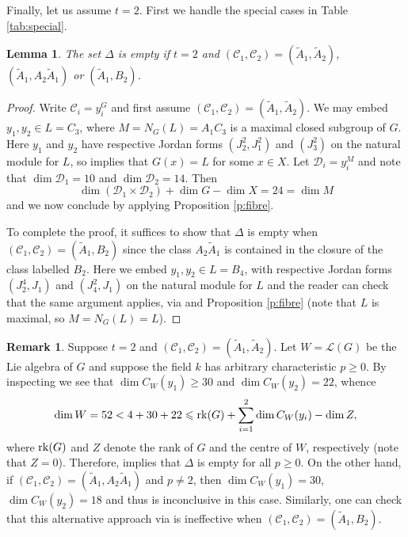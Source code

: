 \documentclass[twoside,a4paper,reqno,11pt]{amsart}
\newcommand{\<}{\langle}
\renewcommand{\>}{\rangle}
\newcommand{\leqs}{\leqslant}
\newcommand{\geqs}{\geqslant}
\renewcommand{\:}{\colon}
\theoremstyle{plain}
\newtheorem{lem}[thm]{Lemma}
\theoremstyle{definition}
\newtheorem{rem}[thm]{Remark}
\begin{document}
Finally, let us assume $t=2$. First we handle the special cases in Table \ref{tab:special}. 

\begin{lem}\label{l:f4_31}
The set $\Delta$ is empty if $t=2$ and $(\mathcal{C}_1,\mathcal{C}_2) = (\tilde{A}_1,\tilde{A}_2)$, $(\tilde{A}_1,A_2\tilde{A}_1)$ or $(\tilde{A}_1,B_2)$.
\end{lem}

\begin{proof}
Write $\mathcal{C}_i = y_i^G$ and first assume $(\mathcal{C}_1,\mathcal{C}_2) = (\tilde{A}_1,\tilde{A}_2)$. We may embed $y_1,y_2 \in L = C_3$, where $M = N_G(L) = A_1C_3$ is a maximal closed subgroup of $G$. Here $y_1$ and $y_2$ have respective Jordan forms $(J_2^2,J_1^2)$ and $(J_3^2)$ on the natural module for $L$, so \cite[Theorem 7]{BGG2} implies that $G(x) = L$ for some $x \in X$. Let $\mathcal{D}_i = y_i^M$ and note that $\dim \mathcal{D}_1 = 10$ and $\dim \mathcal{D}_2 = 14$. Then  
\[
\dim(\mathcal{D}_1 \times \mathcal{D}_2)+\dim G - \dim X = 24 = \dim M
\]
and we now conclude by applying Proposition \ref{p:fibre}.

To complete the proof, it suffices to show that $\Delta$ is empty when $(\mathcal{C}_1,\mathcal{C}_2) = (\tilde{A}_1,B_2)$ since the class $A_2\tilde{A}_1$ is contained in the closure of the class labelled $B_2$. Here we embed $y_1,y_2 \in L = B_4$, with respective Jordan forms $(J_2^4,J_1)$ and $(J_4^2,J_1)$ on the natural module for $L$ and the reader can check that the same argument applies, via \cite[Theorem 7]{BGG2} and Proposition \ref{p:fibre} (note that $L$ is maximal, so $M = N_G(L) = L$).
\end{proof}

\begin{rem}\label{r:f4_lie}
Suppose $t=2$ and $(\mathcal{C}_1,\mathcal{C}_2) = (\tilde{A}_1,\tilde{A}_2)$. Let $W = \mathcal{L}(G)$ be the Lie algebra of $G$ and suppose the field $k$ has arbitrary characteristic $p \geqs 0$. By inspecting \cite[Table 4]{Law1} we see that $\dim C_W(y_1) \geqs 30$ and $\dim C_W(y_2) =22$, whence 
\[
\dim W = 52 < 4+30+22 \leqs {\rm rk}(G) + \sum_{i=1}^2\dim C_W(y_i) - \dim Z,
\]
where ${\rm rk}(G)$ and $Z$ denote the rank of $G$ and the centre of $W$, respectively (note that $Z = 0$). Therefore, \cite[Corollary 3.20]{BGG2} implies that $\Delta$ is empty for all $p \geqs 0$. On the other hand, if $(\mathcal{C}_1,\mathcal{C}_2) = (\tilde{A}_1,A_2\tilde{A}_1)$ and $p \ne 2$, then $\dim C_W(y_1) = 30$, $\dim C_W(y_2) = 18$ and thus \cite[Corollary 3.20]{BGG2} is inconclusive in this case. Similarly, one can check that this alternative approach via \cite[Corollary 3.20]{BGG2} is ineffective when $(\mathcal{C}_1,\mathcal{C}_2) = (\tilde{A}_1,B_2)$.
\end{rem}
\end{document}
